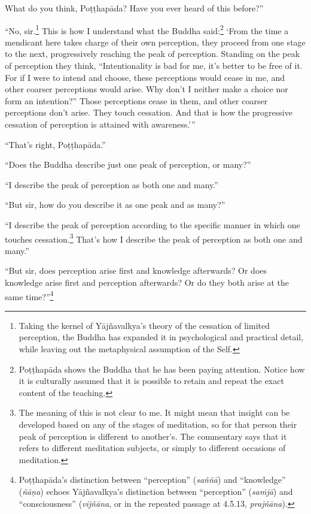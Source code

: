 \documentclass[12pt,openany]{book}%
\begin{document}
What do you think, \textsanskrit{Poṭṭhapāda}? Have you ever heard of this before?” 

“No, sir.\footnote{Taking the kernel of \textsanskrit{Yājñavalkya}’s theory of the cessation of limited perception, the Buddha has expanded it in psychological and practical detail, while leaving out the metaphysical assumption of the Self. } This is how I understand what the Buddha said:\footnote{\textsanskrit{Poṭṭhapāda} shows the Buddha that he has been paying attention. Notice how it is culturally assumed that it is possible to retain and repeat the exact content of the teaching. } ‘From the time a mendicant here takes charge of their own perception, they proceed from one stage to the next, progressively reaching the peak of perception. Standing on the peak of perception they think, “Intentionality is bad for me, it’s better to be free of it. For if I were to intend and choose, these perceptions would cease in me, and other coarser perceptions would arise. Why don’t I neither make a choice nor form an intention?” Those perceptions cease in them, and other coarser perceptions don’t arise. They touch cessation. And that is how the progressive cessation of perception is attained with awareness.’” 

“That’s right, \textsanskrit{Poṭṭhapāda}.” 

“Does the Buddha describe just one peak of perception, or many?” 

“I describe the peak of perception as both one and many.” 

“But sir, how do you describe it as one peak and as many?” 

“I describe the peak of perception according to the specific manner in which one touches cessation.\footnote{The meaning of this is not clear to me. It might mean that insight can be developed based on any of the stages of meditation, so for that person their peak of perception is different to another’s. The commentary says that it refers to different meditation subjects, or simply to different occasions of meditation. } That’s how I describe the peak of perception as both one and many.” 

“But sir, does perception arise first and knowledge afterwards? Or does knowledge arise first and perception afterwards? Or do they both arise at the same time?”\footnote{\textsanskrit{Poṭṭhapāda}’s distinction between “perception” (\textit{\textsanskrit{saññā}}) and “knowledge” (\textit{\textsanskrit{ñāṇa}}) echoes \textsanskrit{Yājñavalkya}’s distinction between “perception” (\textit{\textsanskrit{saṁjā}}) and “consciousness” (\textit{\textsanskrit{vijñāna}}, or in the repeated passage at 4.5.13, \textit{\textsanskrit{prajñāna}}). } 
\end{document}
